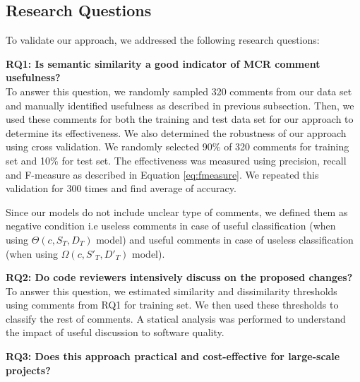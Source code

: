 \subsection{Research Questions}
To validate our approach, we addressed the following research questions:

\noindent \textbf{RQ1: Is semantic similarity a good indicator of MCR comment usefulness?}\\
\indent To answer this question, we randomly sampled 320 comments from our data set and manually identified usefulness as described in previous subsection. Then, we used these comments for both the training and test data set for our approach to determine its effectiveness. We also determined the robustness of our approach using cross validation. We randomly selected 90\% of 320 comments for training set and 10\% for test set.
The effectiveness was measured using precision, recall and F-measure as described in Equation \ref{eq:fmeasure}. We repeated this validation for 300 times and find average of accuracy.


Since our models do not include unclear type of comments, we defined them as negative condition i.e useless comments in case of useful classification (when using $\Theta(c,S_T,D_T)$ model) and useful comments in case of useless classification (when using $\Omega(c,S'_T,D'_T)$ model).


%


\noindent \textbf{RQ2: Do code reviewers intensively discuss on the proposed changes?}\\
\indent To answer this question, we estimated similarity and dissimilarity thresholds using comments from RQ1 for training set. We then used these thresholds to classify the rest of comments. A statical analysis was performed to understand the impact of useful discussion to software quality.

\noindent \textbf{RQ3: Does this approach practical and cost-effective for large-scale projects?}\\
\indent




